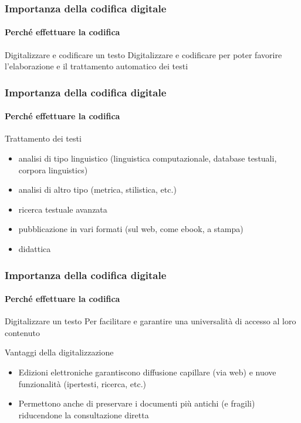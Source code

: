 
\begin{frame}
	\frametitle{Importanza della codifica digitale}
	\framesubtitle{Perché effettuare la codifica}
	\addtocounter{nframe}{1}

	\begin{block}{Digitalizzare e codificare un testo}
		Digitalizzare e codificare per poter favorire l'elaborazione e il trattamento automatico dei testi
	\end{block}
\end{frame}

\begin{frame}
	\frametitle{Importanza della codifica digitale}
	\framesubtitle{Perché effettuare la codifica}
	\addtocounter{nframe}{1}

	\begin{block}{Trattamento dei testi}
		\begin{itemize}
			\item  analisi di tipo linguistico (linguistica computazionale,
			      database testuali, corpora linguistics)
			\item analisi di altro tipo (metrica, stilistica, etc.)
			\item ricerca testuale avanzata
			\item pubblicazione in vari formati (sul web, come ebook, a
			      stampa)
			\item didattica
		\end{itemize}

	\end{block}
\end{frame}


\begin{frame}
	\frametitle{Importanza della codifica digitale}
	\framesubtitle{Perché effettuare la codifica}
	\addtocounter{nframe}{1}

	\begin{block}{Digitalizzare un testo}
		Per facilitare e garantire una universalità di accesso al loro contenuto
	\end{block}

	\begin{block}{Vantaggi della digitalizzazione}
		\begin{itemize}
			\item Edizioni elettroniche garantiscono diffusione capillare
			      (via web) e nuove funzionalità (ipertesti, ricerca, etc.)
			\item Permettono anche di preservare i documenti più antichi
			      (e fragili) riducendone la consultazione diretta
		\end{itemize}
	\end{block}
\end{frame}

